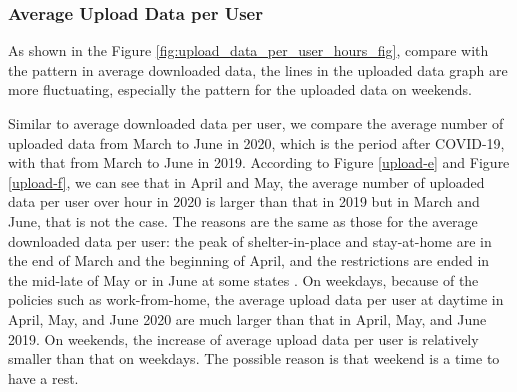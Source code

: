 \subsubsection{Average Upload Data per User}
\label{sec:upload-data-per-user-over-hours}


As shown in the Figure \ref{fig:upload_data_per_user_hours_fig}, compare with the pattern in average downloaded data, the lines in the uploaded data graph are more fluctuating, especially the pattern for the uploaded data on weekends. 

Similar to average downloaded data per user, we compare the average number of uploaded data from March to June in 2020, which is the period after COVID-19, with that from March to June in 2019. According to Figure \ref{upload-e} and Figure \ref{upload-f}, we can see that in April and May, the average number of uploaded data per user over hour in 2020 is larger than that in 2019 but in March and June, that is not the case. The reasons are the same as those for the average downloaded data per user: the peak of shelter-in-place and stay-at-home are in the end of March and the beginning of April, and the restrictions are ended in the mid-late of May or in June at some states \cite{covid19restriction}. On weekdays, because of the policies such as work-from-home, the average upload data per user at daytime in April, May, and June 2020 are much larger than that in April, May, and June 2019. On weekends, the increase of average upload data per user is relatively smaller than that on weekdays. The possible reason is that weekend is a time to have a rest.  